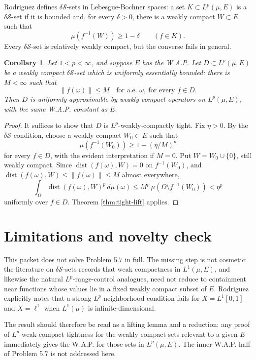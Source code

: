 \documentclass[11pt]{article}
\newtheorem{corollary}{Corollary}
\newcommand{\dist}{\operatorname{dist}}
\begin{document}
Rodriguez defines \(\delta\mathcal S\)-sets in Lebesgue-Bochner spaces: a set \(K\subset L^p(\mu,E)\) is a \(\delta\mathcal S\)-set if it is bounded and, for every \(\delta>0\), there is a weakly compact \(W\subset E\) such that
\[
  \mu(f^{-1}(W))\ge 1-\delta\qquad(f\in K).
\]
Every \(\delta\mathcal S\)-set is relatively weakly compact, but the converse fails in general.

\begin{corollary}\label{cor:bounded-deltas}
Let \(1<p<\infty\), and suppose \(E\) has the W.A.P.  Let \(D\subset L^p(\mu,E)\) be a weakly compact \(\delta\mathcal S\)-set which is uniformly essentially bounded: there is \(M<\infty\) such that
\[
  \|f(\omega)\|\le M\quad\text{for a.e. }\omega,\ \text{for every }f\in D.
\]
Then \(D\) is uniformly approximable by weakly compact operators on \(L^p(\mu,E)\), with the same W.A.P. constant as \(E\).
\end{corollary}

\begin{proof}
It suffices to show that \(D\) is \(L^p\)-weakly-compactly tight.  Fix \(\eta>0\).  By the \(\delta\mathcal S\) condition, choose a weakly compact \(W_0\subset E\) such that
\[
  \mu(f^{-1}(W_0))\ge 1-(\eta/M)^p
\]
for every \(f\in D\), with the evident interpretation if \(M=0\).  Put \(W=W_0\cup\{0\}\), still weakly compact.  Since \(\dist(f(\omega),W)=0\) on \(f^{-1}(W_0)\), and \(\dist(f(\omega),W)\le \|f(\omega)\|\le M\) almost everywhere,
\[
  \int_\Omega \dist(f(\omega),W)^p\,d\mu(\omega)
  \le M^p\,\mu(\Omega\setminus f^{-1}(W_0))<\eta^p
\]
uniformly over \(f\in D\).  Theorem \ref{thm:tight-lift} applies.
\end{proof}

\section{Limitations and novelty check}

This packet does not solve Problem 5.7 in full.  The missing step is not cosmetic: the literature on \(\delta\mathcal S\)-sets records that weak compactness in \(L^1(\mu,E)\), and likewise the natural \(L^p\)-range-control analogues, need not reduce to containment near functions whose values lie in a fixed weakly compact subset of \(E\).  Rodriguez explicitly notes that a strong \(L^p\)-neighborhood condition fails for \(X=L^1[0,1]\) and \(X=\ell^1\) when \(L^1(\mu)\) is infinite-dimensional.

The result should therefore be read as a lifting lemma and a reduction: any proof of \(L^p\)-weak-compact tightness for the weakly compact sets relevant to a given \(E\) immediately gives the W.A.P. for those sets in \(L^p(\mu,E)\).  The inner W.A.P. half of Problem 5.7 is not addressed here.
\end{document}
